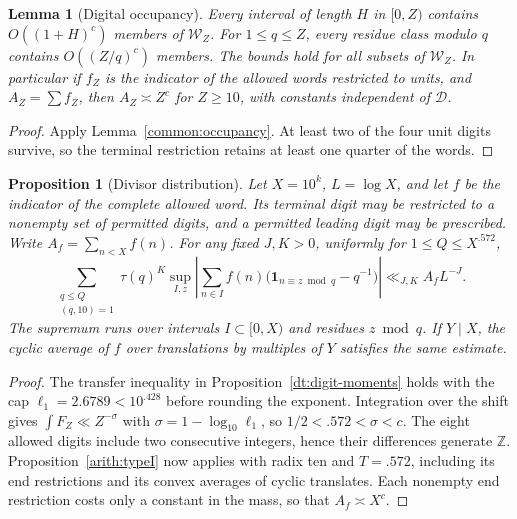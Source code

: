 \documentclass[11pt,a4paper]{article}
\theoremstyle{paperplain}
\newtheorem{lemma}[theorem]{Lemma}
\newtheorem{proposition}[theorem]{Proposition}
\numberwithin{equation}{section}
\newcommand{\ind}{\mathbf1}
\begin{document}
\begin{lemma}[Digital occupancy]\label{dt:digit-occupancy}
Every interval of length \(H\) in \([0,Z)\) contains
\(O((1+H)^c)\) members of \(\mathcal W_Z\). For
\(1\le q\le Z\), every residue class modulo \(q\) contains
\(O((Z/q)^c)\) members. The bounds hold for all subsets of
\(\mathcal W_Z\). In particular if \(f_Z\) is the indicator
of the allowed words restricted to units, and \(A_Z=\sum f_Z\),
then \(A_Z\asymp Z^c\) for \(Z\ge10\), with constants
independent of \(\mathcal D\).
\end{lemma}

\begin{proof}
Apply Lemma~\ref{common:occupancy}. At least two of the four unit
digits survive, so the terminal restriction retains at least one
quarter of the words.
\end{proof}

\begin{proposition}[Divisor distribution]\label{dt:digit-type-i}
Let \(X=10^k\), \(L=\log X\), and let \(f\) be the indicator of
the complete allowed word. Its terminal digit may be restricted
to a nonempty set of permitted digits, and a permitted leading digit
may be prescribed.
Write \(A_f=\sum_{n<X}f(n)\). For any fixed \(J,K>0\), uniformly
for \(1\le Q\le X^{.572}\),
\begin{equation}\label{dt:digit-type-i-equation}
 \sum_{\substack{q\le Q\\(q,10)=1}}\tau(q)^K
 \sup_{I,z}\left|\sum_{n\in I} f(n)
     \bigl(\ind_{n\equiv z\bmod q}-q^{-1}\bigr)\right|
 \ll_{J,K} A_f L^{-J}.
\end{equation}
The supremum runs over intervals \(I\subset[0,X)\) and
residues \(z\bmod q\). If \(Y\mid X\), the cyclic average of
\(f\) over translations by multiples of \(Y\) satisfies the
same estimate.
\end{proposition}

\begin{proof}
The transfer inequality in Proposition~\ref{dt:digit-moments} holds with
the cap $\ell_1=2.6789<10^{.428}$ before rounding the exponent.
Integration over the shift gives $\int F_Z\ll Z^{-\sigma}$ with
$\sigma=1-\log_{10}\ell_1$, so $1/2<.572<\sigma<c$. The eight
allowed digits include two consecutive integers, hence their differences
generate $\mathbb Z$. Proposition~\ref{arith:typeI} now applies with
radix ten and $T=.572$, including its end restrictions and its convex
averages of cyclic translates. Each nonempty end restriction costs
only a constant in the mass, so that $A_f\asymp X^c$.
\end{proof}
\end{document}
